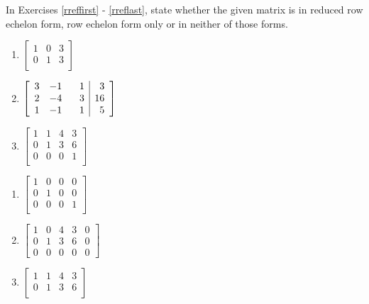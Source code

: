 \label{ExercisesforAugMatrices}

In Exercises \ref{rreffirst} - \ref{rreflast}, state whether the given matrix is in reduced row echelon form, row echelon form only or in neither of those forms.

\begin{multicols}{3} 
\begin{enumerate}


\item $\left[ \begin{array}{rr|r} 
1 & 0 & 3 \\ 
0 & 1 & 3  \\ 
\end{array} \right]$ \label{rreffirst}

\item $\left[ \begin{array}{rrr|r} 
3 & -1 & \hphantom{-}1 & 3 \\ 
2 & -4 & 3 & 16 \\ 
1 & -1 & 1 & 5  \\
\end{array} \right]$

\item $\left[ \begin{array}{rrr|r} 
1 & 1 & 4 & 3 \\ 
0 & 1 & 3 & 6 \\ 
0 & 0 & 0 & 1  \\
\end{array} \right]$

\setcounter{HW}{\value{enumi}}
\end{enumerate}
\end{multicols}

\begin{multicols}{3}
\begin{enumerate}
\setcounter{enumi}{\value{HW}}


\item $\left[ \begin{array}{rrr|r} 
1 & 0 & 0 & 0 \\ 
0 & 1 & 0 & 0 \\ 
0 & 0 & 0 & 1  \\
\end{array} \right]$

\item $\left[ \begin{array}{rrrr|r} 
1 & 0 & 4 & 3 & 0 \\ 
0 & 1 & 3 & 6 & 0 \\ 
0 & 0 & 0 & 0 & 0 
\end{array} \right]$

\item $\left[ \begin{array}{rrr|r} 
1 & 1 & 4 & 3 \\ 
0 & 1 & 3 & 6 \\
\end{array} \right]$ \label{rreflast}

\setcounter{HW}{\value{enumi}}
\end{enumerate}
\end{multicols}

